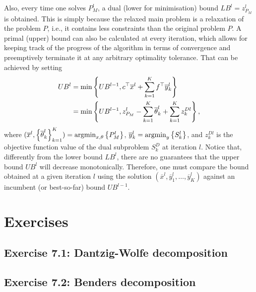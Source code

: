 Also, every time one solves $P_M^l$, a dual (lower for minimisation) bound $LB^l = z_{P_M}^l$ is obtained. This is simply because the relaxed main problem is a relaxation of the problem $P$, i.e., it contains less constraints than the original problem $P$. A primal (upper) bound can also be calculated at every iteration, which allows for keeping track of the progress of the algorithm in terms of convergence and preemptively terminate it at any arbitrary optimality tolerance. That can be achieved by setting
%
\begin{align*}
	UB^l &= \min\left\{ UB^{l-1}, c^\top \overline{x}^l + \sum_{k=1}^K f^\top \overline{y}_k^l \right \} \\	
	&= \min\left\{ UB^{l-1}, z_{P_M}^l - \sum_{k=1}^K \overline{\theta}_k^l + \sum_{k=1}^K z^{Dl}_{k} \right \},
\end{align*}
%
where $(\overline{x}^l, \left\{ \overline{\theta}^{l}_k \right \}_{k=1}^K) = \mathop{\rm argmin}_{x, \theta} \left\{ P_M^l \right \}$, $\overline{y}_k^l = \mathop{\rm argmin}_y \left\{ S_k^l \right \}$, and $z^{Dl}_{k}$ is the objective function value of the dual subproblem $S_k^D$ at iteration $l$. Notice that, differently from the lower bound $LB^l$, there are no guarantees that the upper bound $UB^l$ will decrease monotonically. Therefore, one must compare the bound obtained at a given iteration $l$ using the solution $(\overline{x}^l, \overline{y}_1^l,\dots, \overline{y}^l_K)$ against an incumbent (or best-so-far) bound $UB^{l-1}$.

\vfill 

\pagebreak	

\section{Exercises}

\subsection*{Exercise 7.1: Dantzig-Wolfe decomposition}


%

\subsection*{Exercise 7.2: Benders decomposition}


